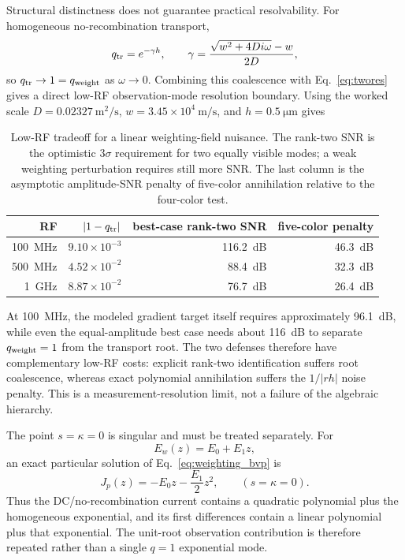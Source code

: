 \documentclass[11pt]{article}
\begin{document}
Structural distinctness does not guarantee practical resolvability. For homogeneous no-recombination transport,
\begin{equation}
q_{\rm tr}=e^{-\gamma h},\qquad
\gamma=\frac{\sqrt{w^2+4Di\omega}-w}{2D},
\end{equation}
so $q_{\rm tr}\to1=q_{\rm weight}$ as $\omega\to0$. Combining this coalescence with Eq.~\eqref{eq:twores} gives a direct low-RF observation-mode resolution boundary. Using the worked scale $D=0.02327~\mathrm{m^2/s}$, $w=3.45\times10^4~\mathrm{m/s}$, and $h=0.5~\si{\micro\meter}$ gives
\begin{table}[H]
\centering
\caption{Low-RF tradeoff for a linear weighting-field nuisance. The rank-two SNR is the optimistic $3\sigma$ requirement for two equally visible modes; a weak weighting perturbation requires still more SNR. The last column is the asymptotic amplitude-SNR penalty of five-color annihilation relative to the four-color test.}
\label{tab:weighting_coalescence}
\begin{tabular}{rrrr}
\toprule
RF & $|1-q_{\rm tr}|$ & best-case rank-two SNR & five-color penalty \\
\midrule
\SI{100}{MHz} & $9.10\times10^{-3}$ & \SI{116.2}{dB} & \SI{46.3}{dB} \\
\SI{500}{MHz} & $4.52\times10^{-2}$ & \SI{88.4}{dB} & \SI{32.3}{dB} \\
\SI{1}{GHz} & $8.87\times10^{-2}$ & \SI{76.7}{dB} & \SI{26.4}{dB} \\
\bottomrule
\end{tabular}
\end{table}
At \SI{100}{MHz}, the modeled gradient target itself requires approximately \SI{96.1}{dB}, while even the equal-amplitude best case needs about \SI{116}{dB} to separate $q_{\rm weight}=1$ from the transport root. The two defenses therefore have complementary low-RF costs: explicit rank-two identification suffers root coalescence, whereas exact polynomial annihilation suffers the $1/|rh|$ noise penalty. This is a measurement-resolution limit, not a failure of the algebraic hierarchy.

The point $s=\kappa=0$ is singular and must be treated separately. For
\begin{equation}
E_w(z)=E_0+E_1z,
\end{equation}
an exact particular solution of Eq.~\eqref{eq:weighting_bvp} is
\begin{equation}
\boxed{J_p(z)=-E_0z-\frac{E_1}{2}z^2,\qquad (s=\kappa=0).}
\label{eq:weighting_dc_particular}
\end{equation}
Thus the DC/no-recombination current contains a quadratic polynomial plus the homogeneous exponential, and its first differences contain a linear polynomial plus that exponential. The unit-root observation contribution is therefore repeated rather than a single $q=1$ exponential mode.
\end{document}
